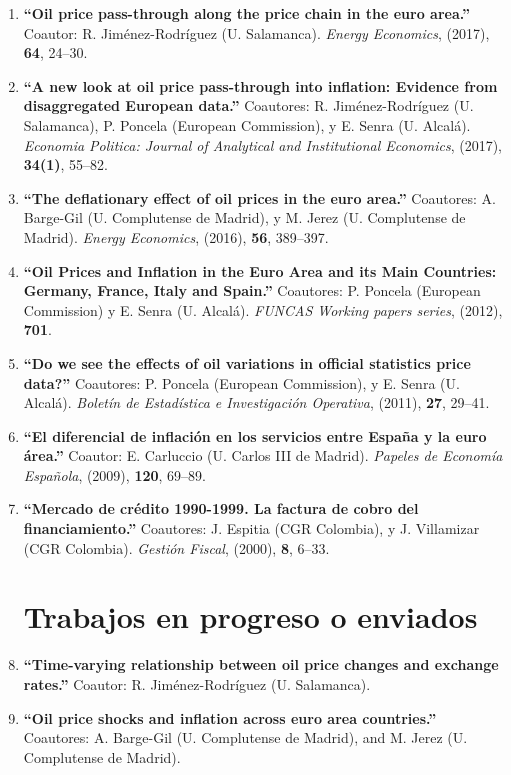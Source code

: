 \documentclass[11pt]{article}\usepackage[]{graphicx}\usepackage[]{color}
\begin{document}
\begin{enumerate}
\item \textbf{``Oil price pass-through along the price chain in the euro area.''} Coautor: R. Jiménez-Rodríguez (U. Salamanca). \emph{Energy Economics}, (2017), \textbf{64}, 24--30.

\item \textbf{``A new look at oil price pass-through into inflation: Evidence from disaggregated European data.''} Coautores: R. Jiménez-Rodríguez (U. Salamanca), P. Poncela (European Commission), y E. Senra (U. Alcalá). \emph{Economia Politica: Journal of Analytical and Institutional Economics}, (2017), \textbf{34(1)}, 55--82.

\item \textbf{``The deflationary effect of oil prices in the euro area.''} Coautores: A. Barge-Gil (U. Complutense de Madrid), y M. Jerez (U. Complutense de Madrid). \emph{Energy Economics}, (2016), \textbf{56}, 389--397.

\item \textbf{``Oil Prices and Inflation in the Euro Area and its Main Countries: Germany, France, Italy and Spain.''} Coautores: P. Poncela (European Commission) y E. Senra (U. Alcalá). \emph{FUNCAS Working papers series}, (2012), \textbf{701}.

\item \textbf{``Do we see the effects of oil variations in official statistics price data?''} Coautores: P. Poncela (European Commission), y E. Senra (U. Alcalá). \emph{Boletín de Estadística e Investigación Operativa}, (2011), \textbf{27}, 29--41.

\item \textbf{``El diferencial de inflación en los servicios entre España y la euro área.''} Coautor: E. Carluccio (U. Carlos III de Madrid). \emph{Papeles de Economía Española}, (2009), \textbf{120}, 69--89.

\item \textbf{``Mercado de crédito 1990-1999. La factura de cobro del financiamiento.''} Coautores: J. Espitia (CGR Colombia), y J. Villamizar (CGR Colombia). \emph{Gestión Fiscal}, (2000), \textbf{8}, 6--33.
\\

\noindent
\section{Trabajos en progreso o enviados}

\item \textbf{``Time-varying relationship between oil price changes and exchange rates.''} Coautor: R. Jiménez-Rodríguez (U. Salamanca).

\item \textbf{``Oil price shocks and inflation across euro area countries.''} Coautores: A. Barge-Gil (U. Complutense de Madrid), and M. Jerez (U. Complutense de Madrid).
\\
\end{enumerate}
\end{document}
